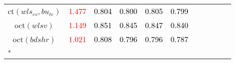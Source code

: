 \begin{tabular}[t]{c|>{}cccc>{}c|ccccc}
ct$(wls_{cs}, bu_{te})$ & \textcolor{red}{1.477} & \textcolor{black}{0.804} & \textcolor{black}{0.800} & \textcolor{black}{0.805} & \textcolor{black}{0.799} &  &  &  &  & \\
oct$(wlsv)$ & \textcolor{red}{1.149} & \textcolor{black}{0.851} & \textcolor{black}{0.845} & \textcolor{black}{0.847} & \textcolor{black}{0.840} &  &  &  &  & \\
oct$(bdshr)$ & \textcolor{red}{1.021} & \textcolor{black}{0.808} & \textcolor{black}{0.796} & \textcolor{black}{0.796} & \textcolor{black}{0.787} &  &  &  &  & \\
\bottomrule
{}\\
\end{tabular}
